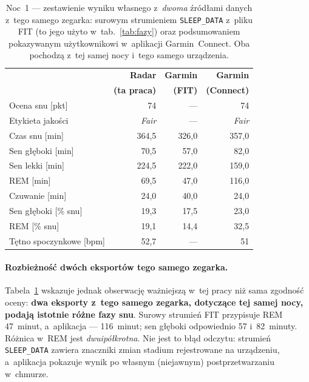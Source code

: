 \documentclass[12pt,a4paper,oneside]{report}
\begin{document}
\begin{table}[H]
\centering
\caption[Ocena snu i fazy: radar a dwa eksporty Garmina (noc 1)]{Noc~1 ---
zestawienie wyniku własnego z~\emph{dwoma} źródłami danych z~tego samego
zegarka: surowym strumieniem \texttt{SLEEP\_DATA} z~pliku FIT (to jego użyto
w~tab.~\ref{tab:fazy}) oraz podsumowaniem pokazywanym użytkownikowi
w~aplikacji Garmin~Connect. Oba pochodzą z~tej samej nocy i~tego samego
urządzenia.}
\label{tab:score-garmin}
\small
\begin{tabular}{@{}lrrr@{}}
\toprule
 & \textbf{Radar} & \textbf{Garmin} & \textbf{Garmin} \\
 & \textbf{(ta praca)} & \textbf{(FIT)} & \textbf{(Connect)} \\
\midrule
Ocena snu [pkt]        & 74 & --- & 74 \\
Etykieta jakości       & \emph{Fair} & --- & \emph{Fair} \\
Czas snu [min]         & 364,5 & 326,0 & 357,0 \\
Sen głęboki [min]      & 70,5 & 57,0 & 82,0 \\
Sen lekki [min]        & 224,5 & 222,0 & 159,0 \\
REM [min]              & 69,5 & 47,0 & 116,0 \\
Czuwanie [min]         & 24,0 & 40,0 & 24,0 \\
\midrule
Sen głęboki [\% snu]   & 19,3 & 17,5 & 23,0 \\
REM [\% snu]           & 19,1 & 14,4 & 32,5 \\
\midrule
Tętno spoczynkowe [bpm] & 52,7 & --- & 51 \\
\bottomrule
\end{tabular}
\end{table}

\paragraph{Rozbieżność dwóch eksportów tego samego zegarka.}
Tabela~\ref{tab:score-garmin} wskazuje jednak obserwację ważniejszą w~tej pracy
niż sama zgodność oceny:
\textbf{dwa eksporty z~tego samego zegarka, dotyczące tej samej nocy, podają
istotnie różne fazy snu}. Surowy strumień FIT przypisuje REM 47~minut,
a~aplikacja --- 116~minut; sen głęboki odpowiednio 57 i~82~minuty. Różnica
w~REM jest \emph{dwuipółkrotna}. Nie jest to błąd odczytu: strumień
\texttt{SLEEP\_DATA} zawiera znaczniki zmian stadium rejestrowane na
urządzeniu, a~aplikacja pokazuje wynik po własnym (niejawnym)
postprzetwarzaniu w~chmurze.
\end{document}
